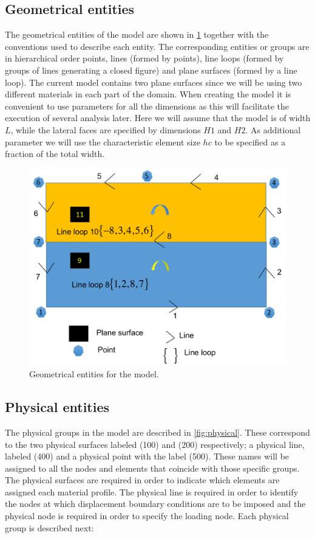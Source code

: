 \documentclass[11pt,letterpaper]{article}
\begin{document}
\subsection{Geometrical entities}
The geometrical entities of the model are shown in \cref{fig:geometrical} together with the conventions used to describe each entity. The corresponding entities or groups are in hierarchical order points, lines (formed by points), line loops (formed by groups of lines generating a closed figure) and plane surfaces (formed by a line loop). The current model contains two plane surfaces since we will be using two different materials in each part of the domain. When creating the model it is convenient to use parameters for all the dimensions as this will facilitate the execution of several analysis later. Here we will assume that the model is of width $L$, while the lateral faces are specified by dimensions $H1$ and $H2$. As additional parameter we will use the characteristic element size $hc$ to be specified as a fraction of the total width.

\begin{figure}[h]
  \centering
  \includegraphics[width=8 cm]{img/geometrical.pdf}
  \caption{Geometrical entities for the model.}
  \label{fig:geometrical}
\end{figure}

\subsection{Physical entities}
The physical groups in the model are described in \cref{fig:physical}. These correspond to the two physical surfaces labeled (100) and (200) respectively; a physical line, labeled (400) and a physical point with the label (500). These names will be assigned to all the nodes and elements that coincide with those specific groups. The physical surfaces are required in order to indicate which elements are assigned each material profile. The physical line is required in order to identify the nodes at which displacement boundary conditions are to be imposed and the physical node is required in order to specify the loading node. Each physical group is described next:
\end{document}
